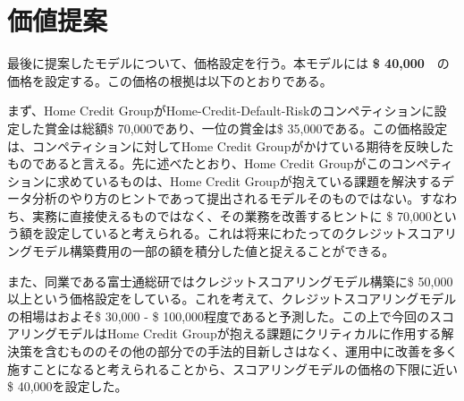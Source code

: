 \documentclass[11pt]{jsarticle}
\begin{document}
    \section{価値提案}\label{ux4fa1ux5024ux63d0ux6848}

    最後に提案したモデルについて、価格設定を行う。本モデルには \textbf{\$
40,000}　の価格を設定する。この価格の根拠は以下のとおりである。

    まず、Home Credit
GroupがHome-Credit-Default-Riskのコンペティションに設定した賞金は総額\$
70,000であり、一位の賞金は\$
35,000である。この価格設定は、コンペティションに対してHome Credit
Groupがかけている期待を反映したものであると言える。先に述べたとおり、Home
Credit Groupがこのコンペティションに求めているものは、Home Credit
Groupが抱えている課題を解決するデータ分析のやり方のヒントであって提出されるモデルそのものではない。すなわち、実務に直接使えるものではなく、その業務を改善するヒントに
\$
70,000という額を設定していると考えられる。これは将来にわたってのクレジットスコアリングモデル構築費用の一部の額を積分した値と捉えることができる。

また、同業である富士通総研ではクレジットスコアリングモデル構築に\$
50,000以上という価格設定をしている\cite{fujitsu}。これを考えて、クレジットスコアリングモデルの相場はおよそ\$
30,000 - \$
100,000程度であると予測した。この上で今回のスコアリングモデルはHome
Credit
Groupが抱える課題にクリティカルに作用する解決策を含むもののその他の部分での手法的目新しさはなく、運用中に改善を多く施すことになると考えられることから、スコアリングモデルの価格の下限に近い\$
40,000を設定した。


    
    
    
    
    
    
    
\end{document}
